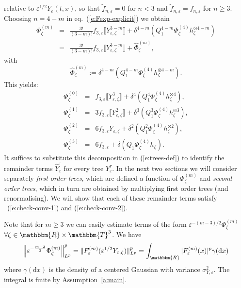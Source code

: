 \documentclass[a4paper,11pt]{article}
\newcommand{\assign}{:=}
\newcommand{\mathd}{\mathrm{d}}
\newcommand{\tmtextit}[1]{{\itshape{#1}}}
\begin{document}
relative to $\varepsilon^{1 / 2} Y_{\varepsilon} (t, x)$, so that
$\tilde{f}_{n, \varepsilon} = 0$ for $n < 3$ and $\tilde{f}_{n, \varepsilon} =
f_{n, \varepsilon}$ for $n \geqslant 3$. Choosing $n = 4 - m$ in
eq.~(\ref{e:Fexp-explicit}) we obtain
\begin{equation}
  \begin{array}{lll}
    \Phi^{(m)}_{\zeta} & = & \frac{3!}{(3 - m) !} f_{3, \varepsilon} 
    \llbracket Y^{3 - m}_{\varepsilon, \zeta} \rrbracket + \delta^{4 - m}
    (Q_1^{4 - m} \Phi^{(4)}_{\zeta} h_{\zeta}^{\otimes 4 - m})\\
    & = & \frac{3!}{(3 - m) !} f_{3, \varepsilon}  \llbracket Y^{3 -
    m}_{\varepsilon, \zeta} \rrbracket + \hat{\Phi}_{\zeta}^{(m)},
  \end{array} \label{e:Fexp-explicit-centered}
\end{equation}
with
\begin{equation}
  \hat{\Phi}^{(m)}_{\zeta} \assign \delta^{4 - m} (Q_1^{4 - m}
  \Phi^{(4)}_{\zeta} h_{\zeta}^{\otimes 4 - m}) .
  \label{e:Fexp-explicit-remainder}
\end{equation}
This yields:
\[ \begin{array}{lll}
     \Phi^{(0)}_{\zeta} & = & f_{3, \varepsilon} \llbracket Y^3_{\varepsilon,
     \zeta} \rrbracket + \delta^4 (Q_1^4 \Phi^{(4)}_{\zeta} h_{\zeta}^{\otimes
     4}),\\
     \Phi^{(1)}_{\zeta} & = & 3 f_{3, \varepsilon} \llbracket
     Y^2_{\varepsilon, \zeta} \rrbracket + \delta^3 (Q_1^3 \Phi^{(4)}_{\zeta}
     h_{\zeta}^{\otimes 3}),\\
     \Phi^{(2)}_{\zeta} & = & 6 f_{3, \varepsilon} Y_{\varepsilon, \zeta} +
     \delta^2 (Q_1^2 \Phi^{(4)}_{\zeta} h_{\zeta}^{\otimes 2}),\\
     \Phi^{(3)}_{\zeta} & = & 6 f_{3, \varepsilon} + \delta (Q_1
     \Phi^{(4)}_{\zeta} h_{\zeta}) .
   \end{array} \]
It suffices to substitute this decomposition in (\ref{e:trees-def}) to
identify the remainder terms $\hat{Y}^{\tau}_{\varepsilon}$ for every tree
$Y^{\tau}_{\varepsilon}$. In the next two sections we will consider separately
\tmtextit{first order trees}, which are defined a function of
$\Phi^{(m)}_{\zeta}$ and \tmtextit{second order trees}, which in turn are
obtained by multiplying first order trees (and renormalising). We will show
that each of these remainder terms satisfy ~(\ref{e:check-conv-1}) and
(\ref{e:check-conv-2}).

\begin{remark}
  \label{r:phi-greater-est}Note that for $m \geqslant 3$ we can easily
  estimate terms of the form $\varepsilon^{- (m - 3) / 2} \Phi^{(m)}_{\zeta}$
  $\forall \zeta \in \mathbbm{R} \times \mathbbm{T}^3$. We have
  \[ \left\| \varepsilon^{- \frac{m - 3}{2}} \Phi^{(m)}_{\zeta}
     \right\|^p_{L^p} = \| F^{(m)}_{\varepsilon} (\varepsilon^{1 / 2}
     Y_{\varepsilon, \zeta}) \|^p_{L^p} = \int_{\mathbbm{R}} |
     F^{(m)}_{\varepsilon} (x) |^p \gamma (\mathd x) \]
  where $\gamma (\mathd x)$ is the density of a centered Gaussian with
  variance $\sigma^2_{Y, \varepsilon}$. The integral is finite by
  Assumption~\ref{a:main}.
\end{remark}
\end{document}
